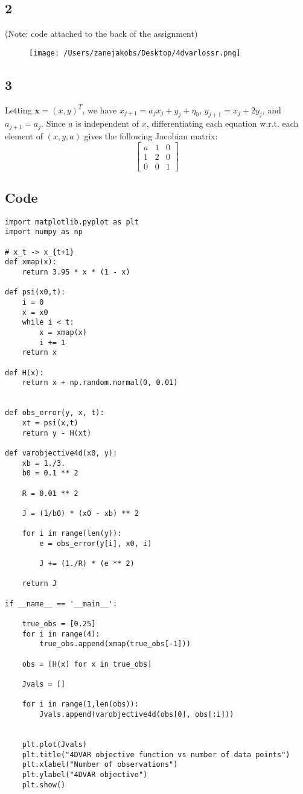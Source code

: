 \documentclass[11pt]{article}
\begin{document}
\subsection*{2}
(Note: code attached to the back of the assignment)
\begin{figure}[H]
\texttt{[image: /Users/zanejakobs/Desktop/4dvarlossr.png]}
\end{figure}

\subsection*{3}
Letting $\bm{x} = (x,y)^T$, we have $x_{j+1} = a_j x_j + y_j + \eta_0$, $y_{j+1} = x_j + 2y_j$, and $a_{j+1} = a_j.$ Since $a$ is independent of $x$, differentiating each equation w.r.t. each element of $(x,y,a)$ gives the following Jacobian matrix:
\[
\begin{bmatrix}a & 1 & 0 \\ 1 & 2 & 0 \\ 0 & 0 & 1 \end{bmatrix}
\]
\subsection*{Code}
\begin{Verbatim}
import matplotlib.pyplot as plt
import numpy as np

# x_t -> x_{t+1}
def xmap(x):
    return 3.95 * x * (1 - x)

def psi(x0,t):
    i = 0
    x = x0
    while i < t:
        x = xmap(x)
        i += 1
    return x

def H(x):
    return x + np.random.normal(0, 0.01)


def obs_error(y, x, t):
    xt = psi(x,t)
    return y - H(xt)  

def varobjective4d(x0, y):
    xb = 1./3.
    b0 = 0.1 ** 2

    R = 0.01 ** 2

    J = (1/b0) * (x0 - xb) ** 2 

    for i in range(len(y)):
        e = obs_error(y[i], x0, i)

        J += (1./R) * (e ** 2)

    return J

if __name__ == '__main__':
    
    true_obs = [0.25]
    for i in range(4):
        true_obs.append(xmap(true_obs[-1]))

    obs = [H(x) for x in true_obs]

    Jvals = []

    for i in range(1,len(obs)):
        Jvals.append(varobjective4d(obs[0], obs[:i]))


    plt.plot(Jvals)
    plt.title("4DVAR objective function vs number of data points")
    plt.xlabel("Number of observations")
    plt.ylabel("4DVAR objective")
    plt.show()
\end{Verbatim}
\end{document}
